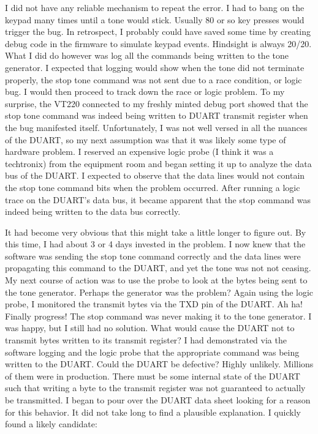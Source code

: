 I did not have any reliable mechanism to repeat the error. I had to bang on the keypad many times until a tone would stick. Usually 80 or so key presses would trigger the bug. In retrospect, I probably could have saved some time by creating debug code in the firmware to simulate keypad events. Hindsight is always 20/20. What I did do however was log all the commands being written to the tone generator. I expected that logging would show when the tone did not terminate properly, the stop tone command was not sent due to a race condition, or logic bug. I would then proceed to track down the race or logic problem. To my surprise, the VT220 connected to my freshly minted debug port showed that the stop tone command was indeed being written to DUART transmit register when the bug manifested itself. Unfortunately, I was not well versed in all the nuances of the DUART, so my next assumption was that it was likely some type of hardware problem. I reserved an expensive logic probe (I think it was a techtronix) from the equipment room and began setting it up to analyze the data bus of the DUART. I expected to observe that the data lines would not contain the stop tone command bits when the problem occurred. After running a logic trace on the DUART's data bus, it became apparent that the stop command was indeed being written to the data bus correctly.

It had become very obvious that this might take a little longer to figure out. By this time, I had about 3 or 4 days invested in the problem. I now knew that the software was sending the stop tone command correctly and the data lines were propagating this command to the DUART, and yet the tone was not not ceasing. My next course of action was to use the probe to look at the bytes being sent to the tone generator. Perhaps the generator was the problem? Again using the logic probe, I monitored the transmit bytes via the TXD pin of the DUART. Ah ha! Finally progress! The stop command was never making it to the tone generator. I was happy, but I still had no solution. What would cause the DUART not to transmit bytes written to its transmit register? I had demonstrated via the software logging and the logic probe that the appropriate command was being written to the DUART. Could the DUART be defective? Highly unlikely. Millions of them were in production. There must be some internal state of the DUART such that writing a byte to the transmit register was not guaranteed to actually be transmitted. I began to pour over the DUART data sheet looking for a reason for this behavior. It did not take long to find a plausible explanation. I quickly found a likely candidate:

